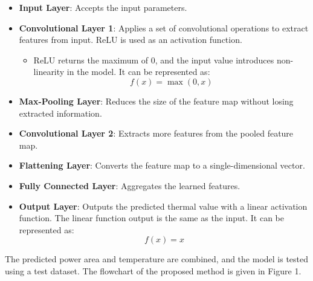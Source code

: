 \documentclass[conference]{IEEEtran}
\begin{document}
\begin{itemize}
	\item \textbf{Input Layer}: Accepts the input parameters.
	
	\item \textbf{Convolutional Layer 1}: Applies a set of convolutional operations to extract features from input. ReLU is used as an activation function.
	\begin{itemize}
		\item ReLU returns the maximum of 0, and the input value introduces non-linearity in the model. It can be represented as:
		\[
		f(x) = \max(0, x)
		\]
	\end{itemize}
	
	\item \textbf{Max-Pooling Layer}: Reduces the size of the feature map without losing extracted information.  
	
	\item \textbf{Convolutional Layer 2}: Extracts more features from the pooled feature map.
	
	\item \textbf{Flattening Layer}: Converts the feature map to a single-dimensional vector.
	
	\item \textbf{Fully Connected Layer}: Aggregates the learned features.
	
	\item \textbf{Output Layer}: Outputs the predicted thermal value with a linear activation function. The linear function output is the same as the input. It can be represented as:
	\[
	f(x) = x
	\]
\end{itemize}
The predicted power area and temperature are combined, and the model is tested using a test dataset. The flowchart of the proposed method is given in Figure 1.
\end{document}
